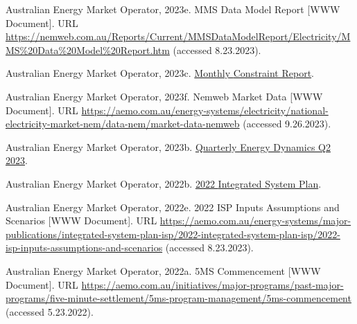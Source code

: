 \documentclass[12pt,a4paper,]{report}
\newlength{\cslhangindent}
\newenvironment{CSLReferences}[2] %
 {%
  \setlength{\parindent}{0pt}
  \ifodd #1 \everypar{\setlength{\hangindent}{\cslhangindent}}\ignorespaces\fi
  \ifnum #2 > 0
  \setlength{\parskip}{#2\baselineskip}
  \fi
 }%
 {}
\begin{document}
\begin{CSLReferences}{1}{0}
\leavevmode{}%
Australian Energy Market Operator, 2023e. {MMS Data Model Report} {[}WWW
Document{]}. URL
\url{https://nemweb.com.au/Reports/Current/MMSDataModelReport/Electricity/MMS\%20Data\%20Model\%20Report.htm}
(accessed 8.23.2023).

\leavevmode{}%
Australian Energy Market Operator, 2023c.
\href{https://aemo.com.au/-/media/files/electricity/nem/security_and_reliability/congestion-information/statistics/2023/monthly-constraint-report-july-2023.pdf?la=en}{Monthly
{Constraint Report}}.

\leavevmode{}%
Australian Energy Market Operator, 2023f. Nemweb {Market Data} {[}WWW
Document{]}. URL
\url{https://aemo.com.au/energy-systems/electricity/national-electricity-market-nem/data-nem/market-data-nemweb}
(accessed 9.26.2023).

\leavevmode{}%
Australian Energy Market Operator, 2023b.
\href{https://aemo.com.au/-/media/files/major-publications/qed/2023/qed-q2-2023-report.pdf?la=en&hash=719538BE6166CB79BE1BF6B9BE82A183}{Quarterly
{Energy Dynamics Q2} 2023}.

\leavevmode{}%
Australian Energy Market Operator, 2022b.
\href{https://aemo.com.au/-/media/files/major-publications/isp/2022/2022-documents/2022-integrated-system-plan-isp.pdf?la=en}{2022
{Integrated System Plan}}.

\leavevmode{}%
Australian Energy Market Operator, 2022e. 2022 {ISP Inputs Assumptions}
and {Scenarios} {[}WWW Document{]}. URL
\url{https://aemo.com.au/energy-systems/major-publications/integrated-system-plan-isp/2022-integrated-system-plan-isp/2022-isp-inputs-assumptions-and-scenarios}
(accessed 8.23.2023).

\leavevmode{}%
Australian Energy Market Operator, 2022a. {5MS Commencement} {[}WWW
Document{]}. URL
\url{https://aemo.com.au/initiatives/major-programs/past-major-programs/five-minute-settlement/5ms-program-management/5ms-commencement}
(accessed 5.23.2022).


\end{CSLReferences}
\end{document}
